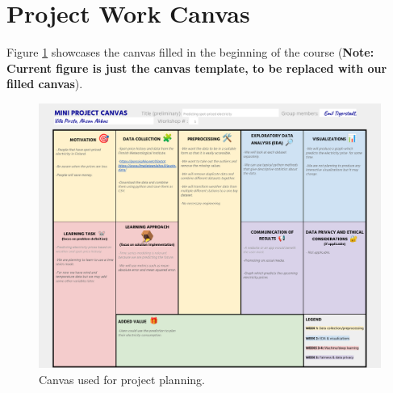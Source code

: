\documentclass{article}
\numberwithin{equation}{section}
\begin{document}
\section{Project Work Canvas}
Figure \ref{fig1} showcases the canvas filled in the beginning of the course (\textbf{Note: Current figure is just the canvas template, to be replaced with our filled canvas}). 


\begin{figure}[htb]
	\centering
	\includegraphics[width=.8\textwidth]{./mini_project_canvas.pdf}
	\caption{Canvas used for project planning.}
	\label{fig1}
\end{figure}

\end{document}
